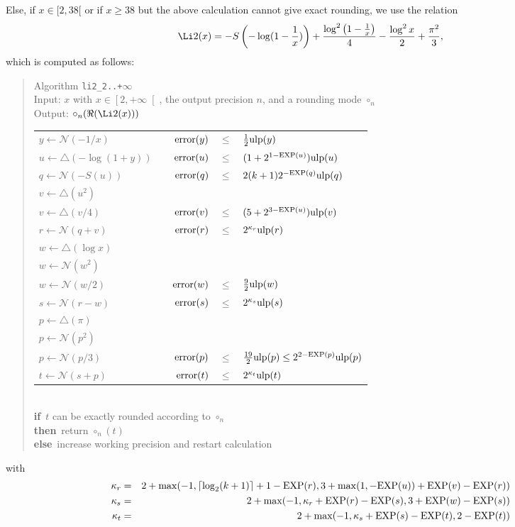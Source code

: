 \documentclass[12pt]{amsart}
\def\n{\textnormal}
\def\pinf{\bigtriangleup}
\def\ulp{{\rm ulp}}
\def\Exp{{\rm EXP}}
\def\N{{\mathcal N}}
\def\If{{\bf if}}
\def\then{{\bf then}}
\def\Else{{\bf else}}
\begin{document}
Else, if $x \in [2, 38[$ or if $x \geq 38$ but the above calculation cannot 
give exact rounding, we use the relation
\[
\Li2(x) = -S\left(-\log(1-\frac{1}{x})\right)
+ \frac{\log^2\left(1-\frac{1}{x}\right)}{4}
- \frac{\log^2x}{2} + \frac{\pi^2}{3},
\]
which is computed as follows:
\begin{quote}
Algorithm {\tt li2\_2..+$\infty$}\\
Input: $x$ with $x \in \left[2, +\infty\right[$, the output precision $n$,
and a rounding mode $\circ_n$ \\
Output: $\circ_n(\Re(\Li2(x)))$ \\
\begin{tabular}{l c r c l}
$y \leftarrow \N(-1/x)$ & &
$\n{error}(y) $ & $ \leq $ & $\frac{1}{2} \ulp(y)$\\
$u \leftarrow \pinf(-\log(1+y))$ &&
$\n{error}(u) $ & $ \leq $ & $(1 + 2^{1-\Exp(u)}) \ulp(u)$\\
$q \leftarrow \N(-S(u))$ &&
$\n{error}(q) $ & $ \leq $ & $2 (k+1) 2^{-\Exp(q)} \ulp(q)$\\

$v \leftarrow \pinf(u^2)$ \\
$v \leftarrow \pinf(v / 4)$ & &
$\n{error}(v) $ & $ \leq $ & $(5 + 2^{3-\Exp(u)}) \ulp(v)$\\
$r \leftarrow \N(q + v)$ & &
$\n{error}(r) $ & $ \leq $ & $2^{\kappa_r} \ulp(r)$\\

$w \leftarrow \pinf(\log x)$\\
$w \leftarrow \N(w^2)$\\
$w \leftarrow \N(w/2)$ & & $\n{error}(w) $ & $ \leq $ & $\frac{9}{2} \ulp(w)$\\
$s \leftarrow \N(r - w)$ & &
$\n{error}(s) $ & $ \leq $ & $2^{\kappa_s} \ulp(s)$\\

$p \leftarrow \pinf(\pi)$ \\
$p \leftarrow \N(p^2)$ \\
$p \leftarrow \N(p/3)$ & &
$\n{error}(p) $ & $ \leq $ & $\frac{19}{2}\ulp(p) \leq 2^{2-\Exp(p)}\ulp(p)$\\
$t \leftarrow \N(s + p)$ & &
$\n{error}(t) $ & $ \leq $ & $2^{\kappa_t} \ulp(t)$
\end{tabular}\\
\If\ $t$ can be exactly rounded according to $\circ_n$\\
\then\ return $\circ_n(t)$\\
\Else\ increase working precision and restart calculation
\end{quote}
with
\begin{eqnarray*}
\kappa_r & = & 2 + {\rm max}(-1, \lceil\log_2(k+1)\rceil + 1 - \Exp(r),
3 + {\rm max}(1, -\Exp(u)) + \Exp(v) - \Exp(r))\\
\kappa_s & = & 2 + {\rm max}(-1, \kappa_r + \Exp(r) - \Exp(s),
3 + \Exp(w) - \Exp(s))\\
\kappa_t & = & 2 + {\rm max}(-1, \kappa_s + \Exp(s) - \Exp(t),
2 - \Exp(t))
\end{eqnarray*}
\end{document}

